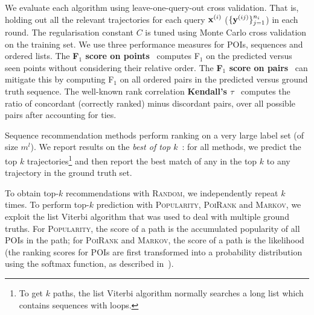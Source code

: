 We evaluate each algorithm using leave-one-query-out cross validation.
That is, holding out all the relevant trajectories for each query $\mathbf{x}^{({i})}$ (\ie $\{\mathbf{y}^{({ij})}\}_{j=1}^{n_i}$) in each round.
The regularisation constant $C$ is tuned using Monte Carlo cross validation %
on the training set.
We use three performance measures for POIs, sequences and ordered lists.
The {\bf F$_1$ score on points}~\cite{ijcai15} computes F$_1$ on the predicted versus seen points
without considering their relative order.
The {\bf F$_1$ score on pairs}~\cite{cikm16paper} %
can mitigate this by computing F$_1$ on all ordered pairs in the predicted versus ground truth sequence. %
The well-known rank correlation {\bf Kendall's $\tau$}~\cite{agresti2010analysis}
computes the ratio of concordant (correctly ranked) %
minus discordant pairs, over all possible pairs after accounting for ties.%

Sequence recommendation methods perform ranking on a very large label set (of size $m^l$).
We report results on the {\em best of top $k$}~\cite{russakovsky2015imagenet}:
for all methods, %
we predict the top $k$ trajectories\footnote{To get $k$ paths, the list Viterbi algorithm normally searches a long list which contains sequences with loops.}
and then report the best match of any in the top $k$ to any trajectory in the ground truth set.

To obtain top-$k$ recommendations with \textsc{Random}, we independently repeat $k$ times.
To perform top-$k$ prediction with \textsc{Popularity}, \textsc{PoiRank} and \textsc{Markov},
we exploit the 
list Viterbi algorithm
that was used to deal with multiple ground truths.
For \textsc{Popularity}, the score of a path is the accumulated popularity of all POIs in the path;
for \textsc{PoiRank} and \textsc{Markov}, the score of a path is the likelihood
(the ranking scores for POIs are first transformed into a probability distribution using the softmax function, as described in~\cite{cikm16paper}).

